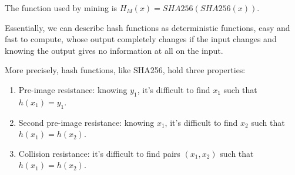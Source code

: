 The function used by mining is $H_M(x) = SHA256(SHA256(x))$.

Essentially, we can describe hash functions as deterministic functions, easy and fast to compute, whose output completely changes if the input changes and knowing the output gives no information at all on the input.

More precisely, hash functions, like SHA256, hold three properties: \newline

\begin{enumerate}
  \item Pre-image resistance: knowing $y_1$, it's difficult to find $x_1$ such that $h(x_1) = y_1$.
  \item Second pre-image resistance: knowing $x_1$, it's difficult to find $x_2$ such that $h(x_1) = h(x_2)$.
  \item Collision resistance: it's difficult to find pairs $(x_1, x_2)$ such that $h(x_1) = h(x_2)$.
\end{enumerate}
